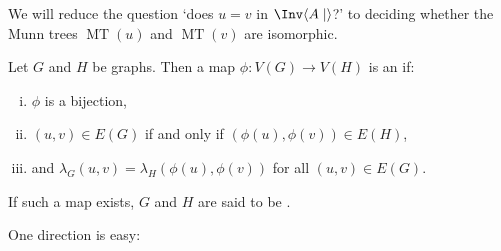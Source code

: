 \documentclass[noindex,noinsetproof,12pt]{lmaths}
\DeclareMathOperator{\MT}{MT}
\begin{document}
	\begin{center}
	\end{center}

We will reduce the question `does $u = v$ in $\Inv \langle A \mid\rangle$?' to deciding whether the Munn trees $\MT(u)$ and $\MT(v)$ are isomorphic.

\begin{defn} \label{def:graph-isomorphism}
	Let $G$ and $H$ be graphs. Then a map $\phi : V(G) \to V(H)$ is an  if:
	\begin{enumerate}[(i)]
		\item $\phi$ is a bijection,
		\item $(u, v) \in E(G)$ if and only if $(\phi(u), \phi(v)) \in E(H)$,
		\item and $\lambda_G(u, v) = \lambda_H(\phi(u), \phi(v))$ for all $(u, v) \in E(G)$.
	\end{enumerate}
	If such a map exists, $G$ and $H$ are said to be .
\end{defn}

One direction is easy:
\end{document}
